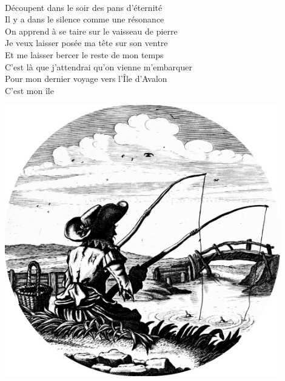 \\Découpent dans le soir des pans d’éternité
\\Il y a dans le silence comme une résonance
\\On apprend à se taire sur le vaisseau de pierre
\\Je veux laisser posée ma tête sur son ventre
\\Et me laisser bercer le reste de mon temps
\\C’est là que j'attendrai qu’on vienne m’embarquer
\\Pour mon dernier voyage vers l’Île d’Avalon
\\C’est mon île \bissimple
\bigskip
\bigskip
\bigskip
\begin{center}
\includegraphics[width=0.9\textwidth]{images/brev41.png}
\end{center}
\breakpage